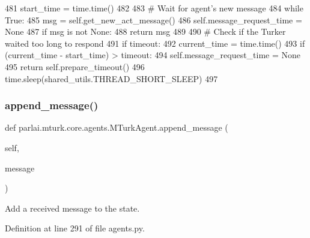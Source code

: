 \begin{DoxyCode}
481                 start\_time = time.time()
482 
483             \textcolor{comment}{# Wait for agent's new message}
484             \textcolor{keywordflow}{while} \textcolor{keyword}{True}:
485                 msg = self.get\_new\_act\_message()
486                 self.message\_request\_time = \textcolor{keywordtype}{None}
487                 \textcolor{keywordflow}{if} msg \textcolor{keywordflow}{is} \textcolor{keywordflow}{not} \textcolor{keywordtype}{None}:
488                     \textcolor{keywordflow}{return} msg
489 
490                 \textcolor{comment}{# Check if the Turker waited too long to respond}
491                 \textcolor{keywordflow}{if} timeout:
492                     current\_time = time.time()
493                     \textcolor{keywordflow}{if} (current\_time - start\_time) > timeout:
494                         self.message\_request\_time = \textcolor{keywordtype}{None}
495                         \textcolor{keywordflow}{return} self.prepare\_timeout()
496                 time.sleep(shared\_utils.THREAD\_SHORT\_SLEEP)
497 
\end{DoxyCode}
\mbox{\label{classparlai_1_1mturk_1_1core_1_1agents_1_1MTurkAgent_aecba90740204ffc85d23649568b7eec0}} 
\subsubsection{\texorpdfstring{append\+\_\+message()}{append\_message()}}
{\footnotesize\ttfamily def parlai.\+mturk.\+core.\+agents.\+M\+Turk\+Agent.\+append\+\_\+message (\begin{DoxyParamCaption}\item[{}]{self,  }\item[{}]{message }\end{DoxyParamCaption})}

\begin{DoxyVerb}Add a received message to the state.
\end{DoxyVerb}
 

Definition at line 291 of file agents.\+py.


